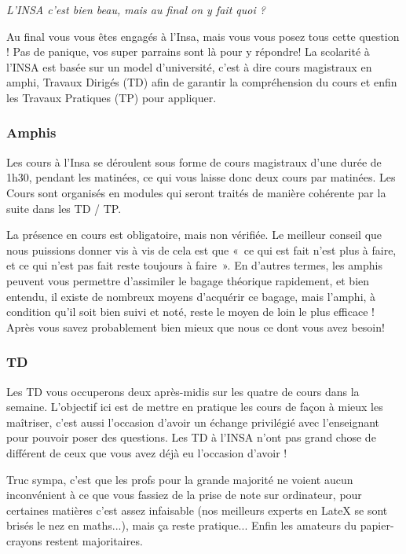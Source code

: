 \begin{citationii}
\emph{L'INSA c'est bien beau, mais au final on y fait quoi ?}
\end{citationii}
Au final vous vous êtes engagés à l'Insa, mais vous vous posez tous cette
question !
Pas de panique, vos super parrains sont là pour y répondre!
La scolarité à l'INSA est basée sur un model d'université, c'est à dire cours
magistraux en amphi, Travaux Dirigés (TD) afin de garantir la compréhension du
cours et enfin les Travaux Pratiques (TP) pour appliquer.

\subsubsection{Amphis}
Les cours à l'Insa se déroulent sous forme de cours magistraux d'une durée de
1h30, pendant les matinées, ce qui vous
laisse donc deux cours par matinées. Les Cours sont organisés en modules qui
seront traités de manière cohérente par la suite dans les TD / TP.

La présence en cours est obligatoire, mais non vérifiée. Le meilleur conseil que
nous puissions donner vis à vis de cela est que «~ce qui est fait n'est plus à
faire, et ce qui n'est pas fait reste toujours à faire~». En d'autres termes, les
amphis peuvent vous permettre d'assimiler le bagage théorique rapidement, et bien
entendu, il existe de nombreux moyens d'acquérir ce bagage, mais l'amphi, à
condition qu'il soit bien suivi et noté, reste le moyen de loin le plus efficace
! Après vous savez probablement bien mieux que nous ce dont vous avez besoin!
\subsubsection{TD}
Les TD vous occuperons deux après-midis sur les quatre de cours dans la semaine.
L'objectif ici est de mettre en pratique les cours de façon à mieux les
maîtriser, c'est aussi l'occasion d'avoir un échange privilégié avec
l'enseignant pour pouvoir poser des questions. Les TD à l'INSA n'ont pas grand
chose de différent de ceux que vous avez déjà eu l'occasion d'avoir ! 

Truc sympa, c'est que les profs pour la grande majorité ne voient aucun
inconvénient à ce que vous fassiez de la prise de note sur ordinateur, pour
certaines matières c'est assez infaisable (nos meilleurs experts en LateX se
sont brisés le nez en maths...), mais ça reste pratique... Enfin les
amateurs du papier-crayons restent majoritaires.
